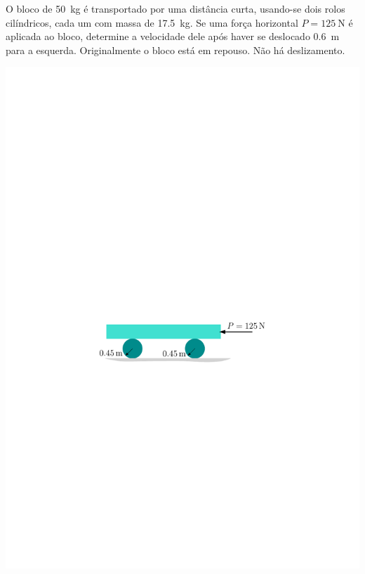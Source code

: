 \item O bloco de \SI{50}{\kilogram} é transportado por uma distância curta, usando-se dois rolos cilíndricos, cada um
com massa de \SI{17.5}{\kilogram}. Se uma força horizontal $P=\SI{125}{\newton}$ é aplicada ao bloco, determine a velocidade
dele após haver se deslocado \SI{.6}{\meter} para a esquerda. Originalmente o bloco está em repouso. Não há deslizamento.

\begin{flushright}
	\includegraphics[scale=.8]{../../images/draw_4}
\end{flushright}